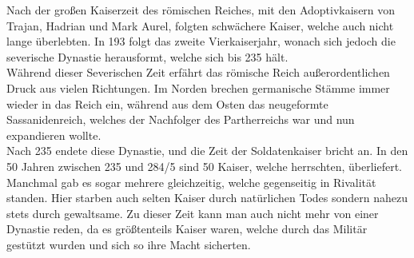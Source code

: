 \documentclass{article}
\begin{document}
	Nach der großen Kaiserzeit des römischen Reiches, mit den Adoptivkaisern von Trajan, Hadrian und Mark Aurel, folgten schwächere Kaiser, welche auch nicht lange überlebten. In 193 folgt das zweite Vierkaiserjahr, wonach sich jedoch die severische Dynastie herausformt, welche sich bis 235 hält. \\
	Während dieser Severischen Zeit erfährt das römische Reich außerordentlichen Druck aus vielen Richtungen. Im Norden brechen germanische Stämme immer wieder in das Reich ein, während aus dem Osten das neugeformte Sassanidenreich, welches der Nachfolger des Partherreichs war und nun expandieren wollte. \\
	Nach 235 endete diese Dynastie, und die Zeit der Soldatenkaiser bricht an. In den 50 Jahren zwischen 235 und 284/5 sind 50 Kaiser, welche herrschten, überliefert. Manchmal gab es sogar mehrere gleichzeitig, welche gegenseitig in Rivalität standen. Hier starben auch selten Kaiser durch natürlichen Todes sondern nahezu stets durch gewaltsame. Zu dieser Zeit kann man auch nicht mehr von einer Dynastie reden, da es größtenteils Kaiser waren, welche durch das Militär gestützt wurden und sich so ihre Macht sicherten. \\
\end{document}
